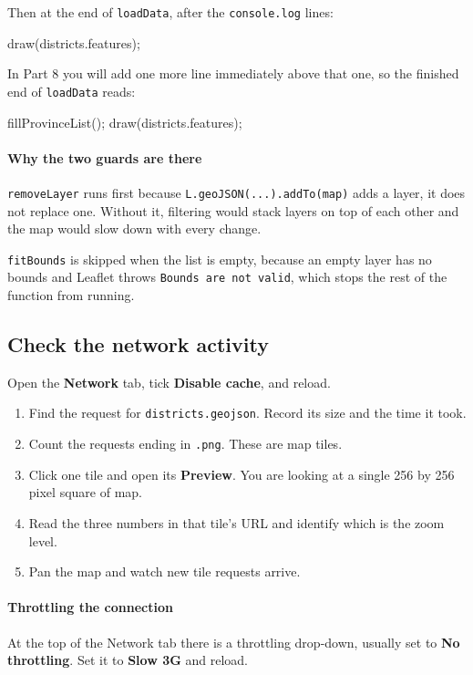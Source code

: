 \documentclass{article}
\newcommand{\cd}[1]{\texttt{#1}}
\begin{document}
Then at the end of \cd{loadData}, after the \cd{console.log} lines:

\begin{code}
  draw(districts.features);
\end{code}

\noindent In Part 8 you will add one more line immediately above that
one, so the finished end of \cd{loadData} reads:

\begin{code}
  fillProvinceList();
  draw(districts.features);
\end{code}

\paragraph{Why the two guards are there}
\cd{removeLayer} runs first because \cd{L.geoJSON(...).addTo(map)} adds a
layer, it does not replace one. Without it, filtering would stack layers
on top of each other and the map would slow down with every change.

\cd{fitBounds} is skipped when the list is empty, because an empty layer
has no bounds and Leaflet throws \cd{Bounds are not valid}, which stops
the rest of the function from running.




\subsection{Check the network activity}

Open the \textbf{Network} tab, tick \textbf{Disable cache}, and reload.

\begin{enumerate}
  \item Find the request for \cd{districts.geojson}. Record its size and
        the time it took.
  \item Count the requests ending in \cd{.png}. These are map tiles.
  \item Click one tile and open its \textbf{Preview}. You are looking at
        a single 256 by 256 pixel square of map.
  \item Read the three numbers in that tile's URL and identify which is
        the zoom level.
  \item Pan the map and watch new tile requests arrive.
\end{enumerate}

\paragraph{Throttling the connection}
At the top of the Network tab there is a throttling drop-down, usually
set to \textbf{No throttling}. Set it to \textbf{Slow 3G} and reload.
\end{document}
